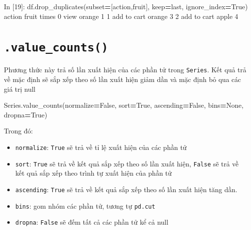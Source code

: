 \documentclass[
]{book}
\newenvironment{Shaded}{\begin{snugshade}}{\end{snugshade}}
\newcommand{\DecValTok}[1]{\textcolor[rgb]{0.00,0.00,0.81}{#1}}
\newcommand{\NormalTok}[1]{#1}
\newcommand{\OperatorTok}[1]{\textcolor[rgb]{0.81,0.36,0.00}{\textbf{#1}}}
\newcommand{\StringTok}[1]{\textcolor[rgb]{0.31,0.60,0.02}{#1}}
\newcommand{\VariableTok}[1]{\textcolor[rgb]{0.00,0.00,0.00}{#1}}
\begin{document}
\begin{Shaded}
\begin{Highlighting}[]
\NormalTok{In [}\DecValTok{19}\NormalTok{]: df.drop\_duplicates(subset}\OperatorTok{=}\NormalTok{[}\StringTok{\textquotesingle{}action\textquotesingle{}}\NormalTok{,}\StringTok{\textquotesingle{}fruit\textquotesingle{}}\NormalTok{], keep}\OperatorTok{=}\StringTok{\textquotesingle{}last\textquotesingle{}}\NormalTok{, ignore\_index}\OperatorTok{=}\VariableTok{True}\NormalTok{)}
\NormalTok{        action   fruit  times}
\DecValTok{0}\NormalTok{         view  orange      }\DecValTok{1}
\DecValTok{1}\NormalTok{  add to cart  orange      }\DecValTok{3}
\DecValTok{2}\NormalTok{  add to cart   apple      }\DecValTok{4}
\end{Highlighting}
\end{Shaded}

\section{\texorpdfstring{\texttt{.value\_counts()}}{.value\_counts()}}\label{value_counts}

Phương thức này trả số lần xuất hiện của các phần tử trong \texttt{Series}. Kết quả trả về mặc định sẽ sắp xếp theo số lần xuất hiện giảm dần và mặc định bỏ qua các giá trị null

\begin{Shaded}
\begin{Highlighting}[]
\NormalTok{Series.value\_counts(normalize}\OperatorTok{=}\VariableTok{False}\NormalTok{, sort}\OperatorTok{=}\VariableTok{True}\NormalTok{, ascending}\OperatorTok{=}\VariableTok{False}\NormalTok{, bins}\OperatorTok{=}\VariableTok{None}\NormalTok{, dropna}\OperatorTok{=}\VariableTok{True}\NormalTok{)}
\end{Highlighting}
\end{Shaded}

Trong đó:

\begin{itemize}
\item
  \texttt{normalize}: \texttt{True} sẽ trả về tỉ lệ xuất hiện của các phần tử
\item
  \texttt{sort}: \texttt{True} sẽ trả về kết quả sắp xếp theo số lần xuất hiện, \texttt{False} sẽ trả về kết quả sắp xếp theo trình tự xuất hiện của phần tử
\item
  \texttt{ascending}: \texttt{True} sẽ trả về kết quả sắp xếp theo số lần xuất hiện tăng dần.
\item
  \texttt{bins}: gom nhóm các phần tử, tương tự \texttt{pd.cut}
\item
  \texttt{dropna}: \texttt{False} sẽ đếm tất cả các phần tử kể cả null
\end{itemize}
\end{document}
